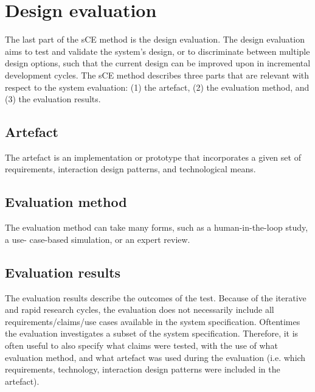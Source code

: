 \chapter{Design evaluation}
The last part of the sCE method is the design evaluation. The design evaluation aims to test and validate the system’s design, or to discriminate between multiple design options, such that the current design can be improved upon in incremental development cycles. The sCE method describes three parts that are relevant with respect to the system evaluation: (1) the artefact, (2) the evaluation method, and (3) the evaluation results.

\section{Artefact}
The artefact is an implementation or prototype that incorporates a given set of requirements, interaction design patterns, and technological means.

\section{Evaluation method}
The evaluation method can take many forms, such as a human-in-the-loop study, a use- case-based simulation, or an expert review.

\section{Evaluation results}
The evaluation results describe the outcomes of the test. Because of the iterative and rapid research cycles, the evaluation does not necessarily include all requirements/claims/use cases available in the system specification. Oftentimes the evaluation investigates a subset of the system specification. Therefore, it is often useful to also specify what claims were tested, with the use of what evaluation method, and what artefact was used during the evaluation (i.e. which requirements, technology, interaction design patterns were included in the artefact).